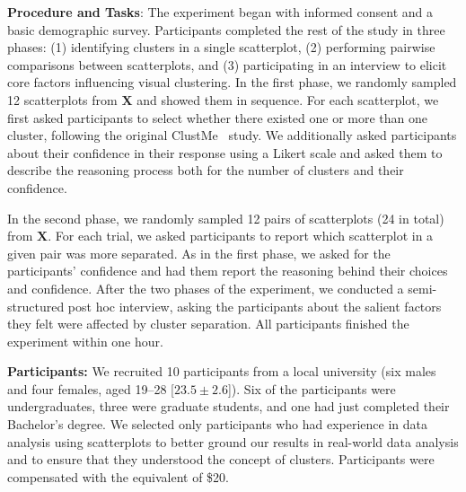 \noindent
\textbf{Procedure and Tasks}: 
The experiment began with informed consent and a basic demographic survey. Participants completed the rest of the study in three phases: (1) identifying clusters in a single scatterplot, (2) performing pairwise comparisons between scatterplots, and (3) participating in an interview to elicit core factors influencing visual clustering. 
In the first phase, we randomly sampled 12 scatterplots from $\mathbf{X}$ and showed them in sequence. For each scatterplot, we first asked participants to select whether there existed one or more than one cluster, following the original ClustMe~\cite{abbas19cgf} study. We additionally asked participants about their confidence in 
their response using a Likert scale
and asked them to describe the reasoning process
both for the number of clusters and their confidence. 

In the second phase, we randomly sampled 12 pairs of scatterplots (24 in total) from $\mathbf{X}$. 
For each trial, we asked participants to report which scatterplot in a given pair was more separated. As in the first phase, we asked for the participants' confidence and had them report the reasoning behind their choices and confidence. 
After the two phases of the experiment, we conducted a semi-structured post hoc interview, asking the participants about the salient factors they felt were affected by cluster separation.
All participants finished the experiment within one hour.

\noindent
\textbf{Participants:}
We recruited 10 participants from a local university (six males and four females, aged 19--28 [$23.5\pm 2.6$]). Six of the participants were undergraduates, three were graduate students, and one had just completed their Bachelor's degree.
We selected only participants who had experience in data analysis using scatterplots to better ground our results in real-world data analysis and to ensure that they understood the concept of clusters.
Participants were compensated with the equivalent of \$20.

